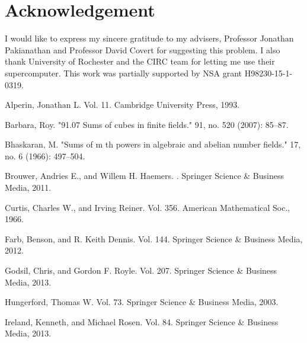\documentclass[11pt,reqno]{amsart}
\begin{document}
\section*{Acknowledgement}
I would like to express my sincere gratitude to my advisers, Professor Jonathan Pakianathan and Professor David Covert for suggesting this problem. I also thank University of Rochester and the CIRC team for letting me use their supercomputer. This work was partially supported by NSA grant H98230-15-1-0319.

%
%

\begin{thebibliography}{10}
Alperin, Jonathan L.
 Vol. 11.
\newblock Cambridge University Press, 1993.

Barbara, Roy.
\newblock "91.07 Sums of cubes in finite fields."
 91, no. 520 (2007): 85--87.

Bhaskaran, M.
\newblock "Sums of m th powers in algebraic and abelian number fields."
 17, no. 6 (1966): 497--504.

Brouwer, Andries E., and Willem H. Haemers.
.
\newblock Springer Science \& Business Media, 2011.

Curtis, Charles W., and Irving Reiner.
 Vol. 356.
\newblock American Mathematical Soc., 1966.

Farb, Benson, and R. Keith Dennis.
 Vol. 144.
\newblock Springer Science \& Business Media, 2012.

Godsil, Chris, and Gordon F. Royle.
 Vol. 207. 
\newblock Springer Science \& Business Media, 2013.

Hungerford, Thomas W. 
 Vol. 73.
\newblock Springer Science \& Business Media, 2003.

Ireland, Kenneth, and Michael Rosen.
 Vol. 84.
\newblock Springer Science \& Business Media, 2013.


\end{thebibliography}
\end{document}
